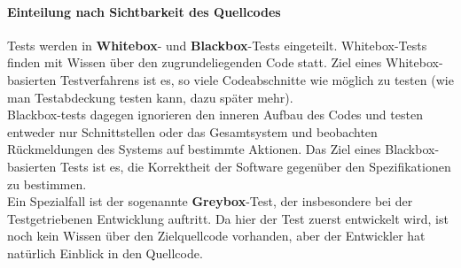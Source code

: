 \paragraph{Einteilung nach Sichtbarkeit des Quellcodes} Tests werden in \textbf{Whitebox}- und \textbf{Blackbox}-Tests eingeteilt.
Whitebox-Tests finden mit Wissen über den zugrundeliegenden Code statt. Ziel eines Whitebox-basierten Testverfahrens ist es, so viele Codeabschnitte wie möglich zu testen (wie man Testabdeckung testen kann, dazu später mehr).\\
Blackbox-tests dagegen ignorieren den inneren Aufbau des Codes und testen entweder nur Schnittstellen oder das Gesamtsystem und beobachten Rückmeldungen des Systems auf bestimmte Aktionen. Das Ziel eines Blackbox-basierten Tests ist es, die Korrektheit der Software gegenüber den Spezifikationen zu bestimmen.\\
Ein Spezialfall ist der sogenannte \textbf{Greybox}-Test, der insbesondere bei der Testgetriebenen Entwicklung auftritt. Da hier der Test zuerst entwickelt wird, ist noch kein Wissen über den Zielquellcode vorhanden, aber der Entwickler hat natürlich Einblick in den Quellcode.

